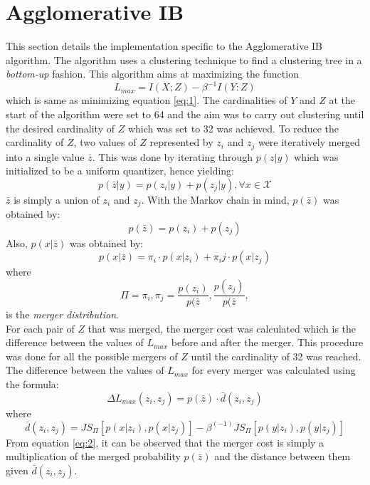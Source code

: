 \section{Agglomerative IB}
This section details the implementation specific to the Agglomerative IB algorithm. The algorithm uses a clustering technique to find a clustering tree in a \emph{bottom-up} fashion.  This algorithm aims at maximizing the function
\begin{equation}
L_{max} = I(X;Z) - \beta^{-1} I(Y:Z) 
\end{equation}
which is same as minimizing  equation \ref{eq:1}.
The cardinalities of $Y$ and $Z$  at the start of the algorithm were set to 64 and the aim was to carry out clustering until the desired cardinality of $Z$ which was set to 32 was achieved. To reduce the cardinality of $Z$, two values of $Z$ represented by $z_i$ and $z_j$ were iteratively merged into a single value $\bar{z}$. This was done by iterating through $p(z|y)$ which was initialized to be a uniform quantizer, hence yielding:
\begin{equation}
p(\bar{z}|y) = p(z_i|y) + p(z_j|y), \forall x \in \mathcal{X}
\end{equation}
$\bar{z}$ is simply a union of $z_i$ and $z_j$. With the Markov chain in mind, $p(\bar{z})$ was obtained by:
\begin{equation}
p(\bar{z}) = p(z_i) + p(z_j)
\end{equation}
Also, $p(x|\bar{z})$ was obtained by:
\begin{equation}
p(x|\bar{z}) = \pi_i \cdot p(x|z_i) +  \pi_ij\cdot p(x|z_j)
\end{equation}
where 
\begin{equation}
\Pi = {\pi_i, \pi_j } = {\frac{p(z_i)}{p(\bar{z}}, \frac{p(z_j)}{p(\bar{z}}},
\end{equation}
is the \emph{merger distribution}.\\
For each pair of $Z$ that was merged, the merger cost was calculated which is the difference between the values of $L_{max}$ before and after the merger. This procedure was done for all the possible mergers of $Z$ until the cardinality of 32 was reached.\\
The difference between the values of $L_{max}$ for every merger was calculated using the formula:
\begin{equation}
\Delta L_{max} (z_i, z_j) = p(\bar{z}) \cdot \bar{d}(z_i, z_j) \label{eq:2}
\end{equation}
where 
\begin{equation}
 \bar{d}(z_i, z_j) = JS_\Pi [p(x|z_i), p(x|z_j)] - \beta^(-1) JS_\Pi[p(y|z_i), p(y|z_j)]
\end{equation}
From equation \ref{eq:2}, it can be observed that the merger cost is simply a multiplication of the merged probability $p(\bar{z}) $ and the distance between them given $\bar{d}(z_i, z_j)$.